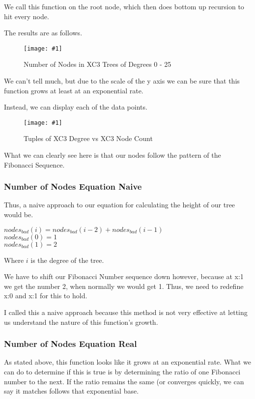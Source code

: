 \documentclass{article}
\newcommand{\figureInsetScaled}[3]
{
    \FloatBarrier{}
    \figureRaw{#1}{#2}{#3}
    \FloatBarrier{}
}
\newcommand{\figureRaw}[3]
{
    \begin{figure}[ht!]
        \centering
        \texttt{[image: \#1]}
        \caption{#2}
    \end{figure}
}
\begin{document}
We call this function on the root node, which then does bottom up recursion to hit every node.

The results are as follows.

\figureInsetScaled{images/experiment4/Figure_1.png}{Number of Nodes in XC3 Trees of Degrees 0 - 25}{0.65}

We can't tell much, but due to the scale of the y axis we can be sure that this function grows at least at an exponential rate.

Instead, we can display each of the data points.

\figureInsetScaled{images/experiment4/points.png}{Tuples of XC3 Degree vs XC3 Node Count}{0.65}

What we can clearly see here is that our nodes follow the pattern of the Fibonacci Sequence.


\subsubsection{Number of Nodes Equation Naive}

Thus, a naive approach to our equation for calculating the height of our tree would be.
\\
{
\Large
\begin{center}
    $nodes_{bad}(i) = nodes_{bad}(i-2) + nodes_{bad}(i-1)$\\
    $ $\\
    $nodes_{bad}(0) = 1$\\
    $nodes_{bad}(1) = 2$\\
    $ $
\end{center}
}
Where $i$ is the degree of the tree.

We have to shift our Fibonacci Number sequence down however, because at x:1 we get the number 2, when normally we would get 1. Thus, we need to redefine x:0 and x:1 for this to hold.

I called this a naive approach because this method is not very effective at letting us understand the nature of this function's growth.

\subsubsection{Number of Nodes Equation Real}

As stated above, this function looks like it grows at an exponential rate. What we can do to determine if this is true is by determining the ratio of one Fibonacci number to the next. If the ratio remains the same (or converges quickly, we can say it matches follows that exponential base.
\end{document}
